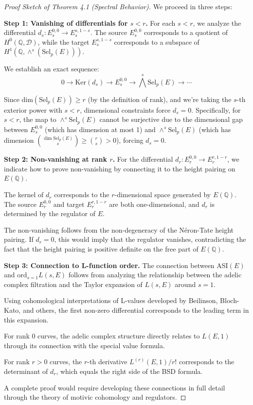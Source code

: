 \documentclass{article}
\theoremstyle{plain}
\theoremstyle{definition}
\theoremstyle{remark}
\begin{document}
\begin{proof}[Proof Sketch of Theorem 4.1 (Spectral Behavior)]
We proceed in three steps:
\vspace{.3cm} 

\textbf{Step 1: Vanishing of differentials for $s < r$.}
For each $s < r$, we analyze the differential $d_s: E_s^{0,0} \to E_s^{s,1-s}$. 
\vspace{.3cm} 
The source $E_s^{0,0}$ corresponds to a quotient of $H^0(\mathbb{Q}, \mathcal{D})$, while the target $E_s^{s,1-s}$ corresponds to a subspace of $H^1(\mathbb{Q}, \wedge^s(\text{Sel}_p(E)))$.

\vspace{.3cm} 
We establish an exact sequence:
\[
0 \to \text{Ker}(d_s) \to E_s^{0,0} \to \bigwedge^s \text{Sel}_p(E) \to \cdots
\]

Since $\text{dim}(\text{Sel}_p(E)) \geq r$ (by the definition of rank), and we're taking the $s$-th exterior power with $s < r$, dimensional constraints force $d_s = 0$. Specifically, for $s < r$, the map to $\wedge^s \text{Sel}_p(E)$ cannot be surjective due to the dimensional gap between $E_s^{0,0}$ (which has dimension at most 1) and $\wedge^s \text{Sel}_p(E)$ (which has dimension $\binom{\dim \text{Sel}_p(E)}{s} \geq \binom{r}{s} > 0$), forcing $d_s = 0$.
\vspace{.3cm} 

\textbf{Step 2: Non-vanishing at rank $r$.}
For the differential $d_r: E_r^{0,0} \to E_r^{r,1-r}$, we indicate how to prove non-vanishing by connecting it to the height pairing on $E(\mathbb{Q})$.

The kernel of $d_r$ corresponds to the $r$-dimensional space generated by $E(\mathbb{Q})$. The source $E_r^{0,0}$ and target $E_r^{r,1-r}$ are both one-dimensional, and $d_r$ is determined by the regulator of $E$.

The non-vanishing follows from the non-degeneracy of the Néron-Tate height pairing. If $d_r = 0$, this would imply that the regulator vanishes, contradicting the fact that the height pairing is positive definite on the free part of $E(\mathbb{Q})$.
\vspace{.3cm} 

\textbf{Step 3: Connection to L-function order.}
The connection between ASI$(E)$ and $\text{ord}_{s=1}L(s, E)$ follows from analyzing the relationship between the adelic complex filtration and the Taylor expansion of $L(s, E)$ around $s = 1$.

Using cohomological interpretations of L-values developed by Beilinson, Bloch-Kato, and others, the first non-zero differential corresponds to the leading term in this expansion.

For rank 0 curves, the adelic complex structure directly relates to $L(E,1)$ through its connection with the special value formula.

For rank $r > 0$ curves, the $r$-th derivative $L^{(r)}(E,1)/r!$ corresponds to the determinant of $d_r$, which equals the right side of the BSD formula.

A complete proof would require developing these connections in full detail through the theory of motivic cohomology and regulators.
\end{proof}
\end{document}
